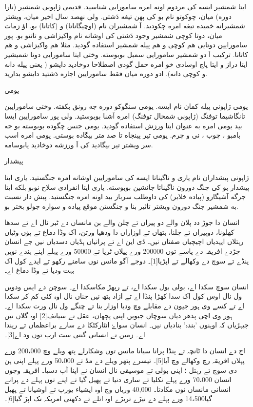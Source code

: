 \documentclass[a4paper]{article}
\begin{document}
ایتا شمشیر ایسه کی مردوم اونه امره سامورایی شناسید. قدیمی ژاپونی شمشیر (نارا دوره) میان، چوکوتو نام بو کی پهن تیغه دَشتی. ولی نهصد سال اخیر میان، ویشتر شمشیرانه خمیده تیغه امره چکودید. اَ شمشیران نام (اوچیگاناتا) و (کاتانا) بو. اؤ زمات میان، دوتا کوچی شمشیر وجود دَشتی کی اوشانه نام واکیزاشی و تانتو بو. پور سامورایین دوتایی هم کوچی و هم پیله شمشیر استفاده گودید. مثلا هم واکیزاشی و هم کاتانا. ترکیب اَ دو شمشیر سامورایی سمبل بوبوسته. وختی ایتا سامورایی دوتا شمیشیر ایتا دراز و ایتا پاچ اوسادی خو امره حمل گودی اصطلاحا دوخادید دایشو ( یعنی پیله دانه و کوچی دانه). ادو دوره میان فقط سامورایین اجازه دَشتید دایشو بدارید.

یومی

یومی ژاپونی پیله کمان نام ایسه. یومی سنگوكو دوره جه رونق بکفته. وختی سامورایین تانگاشیما توفنگ (ژاپونی شمخال توفنگ) امره آشنا بوبوستید. ولی پور سامورایین ایسا بید یومی امره به عنوان ایتا ورزش استفاده گودید. یومی جنس چگوده بوبوسته بو جه بامبو ، چوب ، نی و چرم. یومی تیر پینجاه تا صد متر بیگاده بوستی. یومی امره اسب سر ویشتر تیر بیگادید کی اَ ورزشه دوخادید یابوسامه.

پیشدار

ژاپونی پیشداران نام یاری و ناگیناتا ایسه کی سامورایین اوشانه امره جنگستید. یاری ایتا پیشدار بو کی جنگ دورون ناگیناتا جانشین بوبوسته. یاری ایتا انفرادی سلاح نوبو بلکه ایتا جرگه آشیگارو (پیاده خلابر) کی داوطلب سرباز بید اونه امره جنگستید. پیش دار نسبت به شمشیر جنگ دورون ویشتر تاثیر بنا و جنگستن موقع پیاده و سواره جولو بختر بو.

انسان دا جوڑ دد پلان والے دو پیراں تے چلن والے بن مانساں دے ٹبر نال اے تے سدھا کھلونا، دوپیراں تے چلنا، ہتھاں تے اوزاراں دا ودھیا ورتن، اک وڈا دماغ تے پؤں وٹیاں رہتلاں ایہدیاں اچیچیاں صفتاں نیں۔ ڈی این اے تے پرانیاں ہڈیاں دسدیاں نیں جے انسان چڑدے افریقہ دے پاسے توں 200000 ورے پیلاں ٹریا تے 50000 ورے پہلے اپنے ہندے نویں پنڈے تے سوچ دے وکھالے تے اپڑیا[1]۔ دوجے آگو مانس نوں سامنے رکھو تے ایدے کول اک بہت ودیا تے وڈا دماغ اے۔



انسان سوچ سکدا اے، بولی بول سکدا اے، تے رپھڑ مکاسکدا اے۔ سوچن دے ایس ودویں ول نال اوس کول اک سدا کھڑا پنڈا اے تے ازاد ہتھ نیں جناں نال اوہ کئی کم کر سکدا اے تے کسے وی ہور جیون دے مقابلے وچ ودیا اوزار بنا تے چنگے ول نال ورت سکدا اے۔ ہور وی اچی پدھر دیاں سوچاں جیویں اپنی پچھان، عقل تے سیانف[2] اوہ گلاں نین جیہڑیاں کہ اوہنوں 'بندہ' بنادیاں نیں۔ انسان سواۓ انٹارکٹکا دے سارے براعظماں تے ریندا اے۔ زمین تے انسانی گنتی ست ارب توں ود اے[3]۔

اج دے انسان دا ٹانچہ تے پنڈا پرانا سیانا مانس توں وشکارلے پتھ ویلے وچ 200،000 ورے پہلاں افریقہ رچ وکھالے وچ آیا[5]۔ تیسرے پتھر ویلے دے مڈ تے 50،000 ورے پہلے اپنی ہن دی سوچ تے رہتل ؛ اپنی بولی تے موسیقی نال انسان نے اپنا آپ دسیا۔ افریقہ وجوں انسان 70،000 ورے پہلے نکلیا تے ساری دنیا تے پھیل گیا تے اپنے توں پہلے دے پرانے انسانی مانساں نوں مکادتا۔ 40,000 وریاں وچ اوہ ایشیاء یورپ تے اوشیانا تے پھیل گیا14،500 ورے پہلے دے نیڑے تریڑے اوہ اتلے تے دکھنی امریکہ تک اپڑ گیا[6]۔
\end{document}
